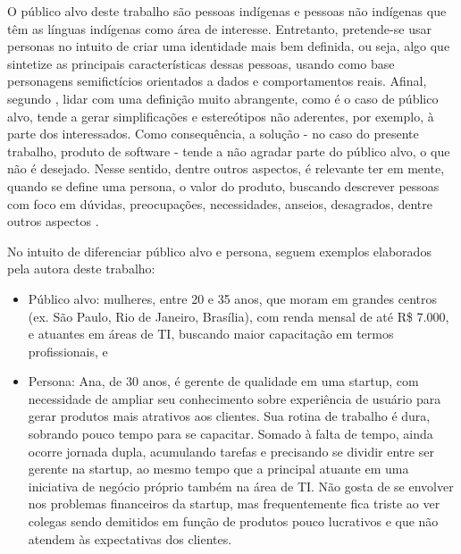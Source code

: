 O público alvo deste trabalho são pessoas indígenas e pessoas não indígenas que têm as línguas 
indígenas como área de interesse. Entretanto, pretende-se usar personas no intuito de criar uma 
identidade mais bem definida, ou seja, algo que sintetize as principais características dessas pessoas, 
usando como base personagens semifictícios orientados a dados e comportamentos reais. Afinal, segundo 
, lidar com uma definição muito abrangente, como é o caso de público alvo, tende a gerar 
simplificações e estereótipos não aderentes, por exemplo, à parte dos interessados. Como consequência, 
a solução - no caso do presente trabalho, produto de software - tende a não agradar parte do público alvo, 
o que não é desejado. Nesse sentido, dentre outros aspectos, é relevante ter em mente, quando se define uma 
persona, o valor do produto, buscando descrever pessoas com foco em dúvidas, preocupações, necessidades, anseios, 
desagrados, dentre outros aspectos \cite{barbosa2010}.

\begin{description}
  \item No intuito de diferenciar público alvo e persona, seguem exemplos elaborados pela autora deste trabalho:
        \begin{itemize}
            \item Público alvo: mulheres, entre 20 e 35 anos, que moram em grandes centros (ex. São Paulo, Rio de Janeiro, Brasília), 
            com renda mensal de até R\$ 7.000, e atuantes em áreas de TI, buscando maior capacitação em termos profissionais, e

            \item Persona: Ana, de 30 anos, é gerente de qualidade em uma startup, com necessidade de ampliar seu conhecimento sobre 
            experiência de usuário para gerar produtos mais atrativos aos clientes. Sua rotina de trabalho é dura, sobrando pouco 
            tempo para se capacitar. Somado à falta de tempo, ainda ocorre jornada dupla, acumulando tarefas e precisando se dividir 
            entre ser gerente na startup, ao mesmo tempo que a principal atuante em uma iniciativa de negócio próprio também na área de TI. 
            Não gosta de se envolver nos problemas financeiros da startup, mas frequentemente fica triste ao ver colegas sendo demitidos em 
            função de produtos pouco lucrativos e que não atendem às expectativas dos clientes.
        \end{itemize}
\end{description}

